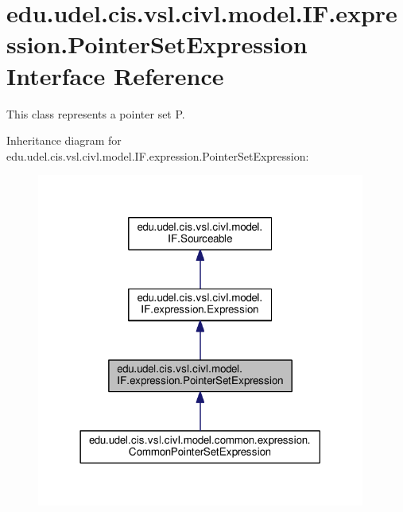 \hypertarget{interfaceedu_1_1udel_1_1cis_1_1vsl_1_1civl_1_1model_1_1IF_1_1expression_1_1PointerSetExpression}{}\section{edu.\+udel.\+cis.\+vsl.\+civl.\+model.\+I\+F.\+expression.\+Pointer\+Set\+Expression Interface Reference}
\label{interfaceedu_1_1udel_1_1cis_1_1vsl_1_1civl_1_1model_1_1IF_1_1expression_1_1PointerSetExpression}


This class represents a pointer set P.  




Inheritance diagram for edu.\+udel.\+cis.\+vsl.\+civl.\+model.\+I\+F.\+expression.\+Pointer\+Set\+Expression\+:
\nopagebreak
\begin{figure}[H]
\begin{center}
\leavevmode
\includegraphics[width=306pt]{interfaceedu_1_1udel_1_1cis_1_1vsl_1_1civl_1_1model_1_1IF_1_1expression_1_1PointerSetExpression__inherit__graph}
\end{center}
\end{figure}


